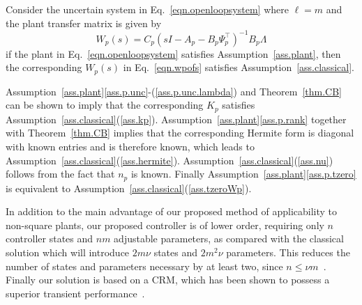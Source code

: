 \documentclass[]{../sty/JGCD}
\theoremstyle{examplestyle}
\begin{document}
  \begin{prop-dan}\label{prop.mimoequiv}
    Consider the uncertain system in Eq.\ \eqref{eqn.openloopsystem} where $\ell=m$ and the plant transfer matrix is given by
    \begin{equation}
      \label{eqn.wpofs}
      W_{p}(s)=C_{p}(sI-A_{p}-B_{p} \Psi_{p}^{\top})^{-1}B_{p}\Lambda
    \end{equation}
    if the plant in Eq.\ \eqref{eqn.openloopsystem} satisfies Assumption~\ref{ass.plant}, then the corresponding $W_p(s)$ in Eq.\ \eqref{eqn.wpofs} satisfies Assumption~\ref{ass.classical}.
  \end{prop-dan}

  \begin{proof-dan}
    Assumption~\ref{ass.plant}\ref{ass.p.unc}-(\ref{ass.p.unc.lambda}) and Theorem~\ref{thm.CB} can be shown to imply that the corresponding $K_p$ satisfies Assumption~\ref{ass.classical}(\ref{ass.kp}).
    Assumption~\ref{ass.plant}\ref{ass.p.rank} together with Theorem~\ref{thm.CB} implies that the corresponding Hermite form is diagonal with known entries and is therefore known, which leads to Assumption~\ref{ass.classical}(\ref{ass.hermite}).
    Assumption~\ref{ass.classical}(\ref{ass.nu}) follows from the fact that $n_{p}$ is known.
    Finally Assumption~\ref{ass.plant}\ref{ass.p.tzero} is equivalent to Assumption~\ref{ass.classical}(\ref{ass.tzeroWp}).
  \end{proof-dan}

  In addition to the main advantage of our proposed method of applicability to non-square plants, our proposed controller is of lower order, requiring only $n$ controller states and $nm$ adjustable parameters, as compared with the classical solution which will introduce $2m\nu$ states and $2m^{2}\nu$ parameters.
  This reduces the number of states and parameters necessary by at least two, since $n\leq\nu m$\ \cite{chen.linear.1999}.
  Finally our solution is based on a CRM, which has been shown to possess a superior transient performance\ \cite{gibson.aiaacrm.2012,gibson.ecc.2013,gibson.ieeeaccess.2013,gibson.acc.2013}.
\end{document}
